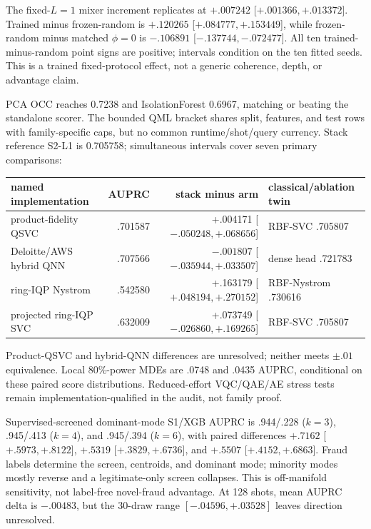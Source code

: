 \documentclass[10pt,a4paper]{article}
\begin{document}
The fixed-$L{=}1$ mixer increment replicates at
$+.007242$ [$+.001366,+.013372$]. Trained minus frozen-random is
$+.120265$ [$+.084777,+.153449$], while frozen-random minus matched $\phi=0$
is $-.106891$ [$-.137744,-.072477$]. All ten trained-minus-random point signs
are positive; intervals condition on the ten fitted seeds. This is a trained
fixed-protocol effect, not a generic coherence, depth, or advantage claim.

PCA OCC reaches 0.7238 and IsolationForest 0.6967, matching or beating the
standalone scorer. The bounded QML bracket shares split, features, and test
rows with family-specific caps, but no common runtime/shot/query currency.
Stack reference S2-L1 is 0.705758; simultaneous intervals cover seven primary
comparisons:
\begin{center}\scriptsize
\begin{tabularx}{\linewidth}{@{}XrrX@{}}
\toprule
named implementation & AUPRC & stack minus arm & classical/ablation twin\\
\midrule
product-fidelity QSVC & .701587 & +.004171 [$-.050248,+.068656$] & RBF-SVC .705807\\
Deloitte/AWS hybrid QNN & .707566 & $-.001807$ [$-.035944,+.033507$] & dense head .721783\\
ring-IQP Nystrom & .542580 & +.163179 [$+.048194,+.270152$] & RBF-Nystrom .730616\\
projected ring-IQP SVC & .632009 & +.073749 [$-.026860,+.169265$] & RBF-SVC .705807\\
\bottomrule
\end{tabularx}
\end{center}
Product-QSVC and hybrid-QNN differences are unresolved; neither meets
$\pm.01$ equivalence. Local 80\%-power MDEs are .0748 and .0435 AUPRC,
conditional on these paired score distributions. Reduced-effort VQC/QAE/AE
stress tests remain implementation-qualified in the audit, not family proof.

Supervised-screened dominant-mode S1/XGB AUPRC is .944/.228 ($k=3$),
.945/.413 ($k=4$), and .945/.394 ($k=6$), with paired differences
$+.7162$ [$+.5973,+.8122$], $+.5319$ [$+.3829,+.6736$], and $+.5507$
[$+.4152,+.6863$]. Fraud labels determine the screen, centroids, and dominant
mode; minority modes mostly reverse and a legitimate-only screen collapses.
This is off-manifold sensitivity, not label-free novel-fraud advantage. At
128 shots, mean AUPRC delta is $-.00483$, but the 30-draw range
$[-.04596,+.03528]$ leaves direction unresolved.
\end{document}
